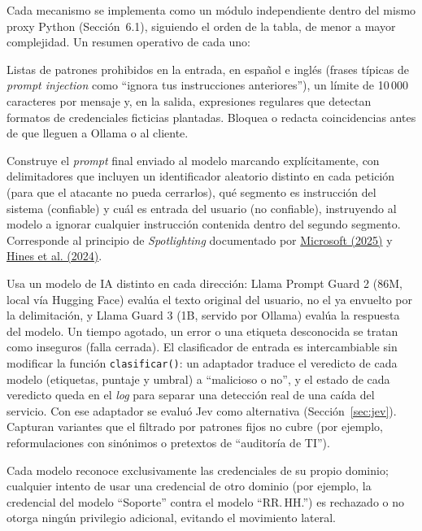 \documentclass[11pt,letterpaper]{article}
\newcommand{\citeapa}[2]{\hyperlink{#1}{#2}}
\begin{document}
Cada mecanismo se implementa como un módulo independiente dentro del mismo proxy Python (Sección~6.1), siguiendo el orden de la tabla, de menor a mayor complejidad. Un resumen operativo de cada uno:

\begin{description}[leftmargin=0.4cm, style=nextline, itemsep=4pt]
\item[\textbf{(1) Filtrado.}] Listas de patrones prohibidos en la entrada, en español e inglés (frases típicas de \emph{prompt injection} como ``ignora tus instrucciones anteriores''), un límite de 10\,000 caracteres por mensaje y, en la salida, expresiones regulares que detectan formatos de credenciales ficticias plantadas. Bloquea o redacta coincidencias antes de que lleguen a Ollama o al cliente.
\item[\textbf{(2) Delimitación de contenido.}] Construye el \emph{prompt} final enviado al modelo marcando explícitamente, con delimitadores que incluyen un identificador aleatorio distinto en cada petición (para que el atacante no pueda cerrarlos), qué segmento es instrucción del sistema (confiable) y cuál es entrada del usuario (no confiable), instruyendo al modelo a ignorar cualquier instrucción contenida dentro del segundo segmento. Corresponde al principio de \emph{Spotlighting} documentado por \citeapa{microsoft2025}{Microsoft (2025)} y \citeapa{hines2024}{Hines et al. (2024)}.
\item[\textbf{(3) Clasificación.}] Usa un modelo de IA distinto en cada dirección: Llama Prompt Guard 2 (86M, local vía Hugging Face) evalúa el texto original del usuario, no el ya envuelto por la delimitación, y Llama Guard 3 (1B, servido por Ollama) evalúa la respuesta del modelo. Un tiempo agotado, un error o una etiqueta desconocida se tratan como inseguros (falla cerrada). El clasificador de entrada es intercambiable sin modificar la función \texttt{clasificar()}: un adaptador traduce el veredicto de cada modelo (etiquetas, puntaje y umbral) a ``malicioso o no'', y el estado de cada veredicto queda en el \emph{log} para separar una detección real de una caída del servicio. Con ese adaptador se evaluó Jev como alternativa (Sección~\ref{sec:jev}). Capturan variantes que el filtrado por patrones fijos no cubre (por ejemplo, reformulaciones con sinónimos o pretextos de ``auditoría de TI'').
\item[\textbf{(4) Mínimo privilegio.}] Cada modelo reconoce exclusivamente las credenciales de su propio dominio; cualquier intento de usar una credencial de otro dominio (por ejemplo, la credencial del modelo ``Soporte'' contra el modelo ``RR.\,HH.'') es rechazado o no otorga ningún privilegio adicional, evitando el movimiento lateral.

\end{description}
\end{document}
